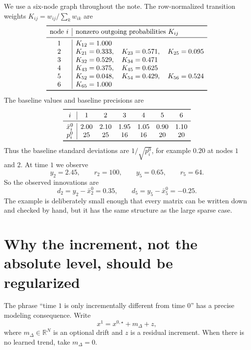 \documentclass[11pt]{article}
\numberwithin{equation}{section}
\newcommand{\R}{\mathbb{R}}
\begin{document}
\begin{runningexample}
We use a six-node graph throughout the note.  The row-normalized transition weights $K_{ij}=w_{ij}/\sum_k w_{ik}$ are
\[
\begin{array}{c|l}
\toprule
\text{node }i & \text{nonzero outgoing probabilities }K_{ij}\\
\midrule
1 & K_{12}=1.000\\
2 & K_{21}=0.333,\quad K_{23}=0.571,\quad K_{25}=0.095\\
3 & K_{32}=0.529,\quad K_{34}=0.471\\
4 & K_{43}=0.375,\quad K_{45}=0.625\\
5 & K_{52}=0.048,\quad K_{54}=0.429,\quad K_{56}=0.524\\
6 & K_{65}=1.000\\
\bottomrule
\end{array}
\]
The baseline values and baseline precisions are
\[
\begin{array}{c|cccccc}
\toprule
 i&1&2&3&4&5&6\\
\midrule
 \bar x_i^0&2.00&2.10&1.95&1.05&0.90&1.10\\
 p_i^0&25&25&16&16&20&20\\
\bottomrule
\end{array}
\]
Thus the baseline standard deviations are $1/\sqrt{p_i^0}$, for example $0.20$ at nodes $1$ and $2$.  At time $1$ we observe
\[
  y_2=2.45,\qquad r_2=100,
  \qquad
  y_5=0.65,
  \qquad r_5=64.
\]
So the observed innovations are
\[
  d_2=y_2-\bar x_2^0=0.35,
  \qquad
  d_5=y_5-\bar x_5^0=-0.25.
\]
The example is deliberately small enough that every matrix can be written down and checked by hand, but it has the same structure as the large sparse case.
\end{runningexample}

\section{Why the increment, not the absolute level, should be regularized}
\label{sec:increment-not-level}

The phrase ``time $1$ is only incrementally different from time $0$'' has a precise modeling consequence.  Write
\begin{equation}
  x^1=x^{0,\star}+m_\Delta+z,
  \label{eq:increment-decomposition}
\end{equation}
where $m_\Delta\in\R^N$ is an optional drift and $z$ is a residual increment.  When there is no learned trend, take $m_\Delta=0$.
\end{document}
